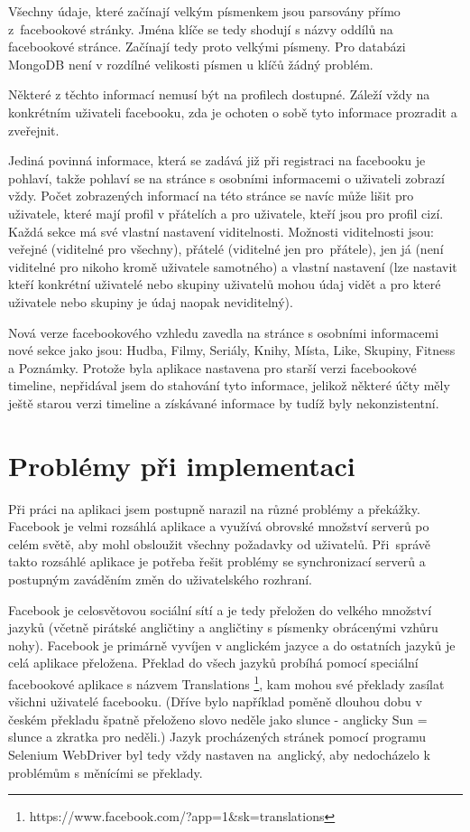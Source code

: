 \documentclass[thesis=M,czech]{FITthesis}[2013/05/10]
\begin{document}
Všechny údaje, které začínají velkým písmenkem jsou parsovány přímo z~facebookové stránky. Jména klíče se tedy shodují s názvy oddílů na facebookové stránce. Začínají tedy proto velkými písmeny. Pro databázi MongoDB není v rozdílné velikosti písmen u klíčů žádný problém.

Některé z těchto informací nemusí být na profilech dostupné. Záleží vždy na konkrétním uživateli facebooku, zda je ochoten o sobě tyto informace prozradit a zveřejnit.

Jediná povinná informace, která se zadává již při registraci na facebooku je pohlaví, takže pohlaví se na stránce s osobními informacemi o uživateli zobrazí vždy. Počet zobrazených informací na této stránce se navíc může lišit pro uživatele, které mají profil v přátelích a pro uživatele, kteří jsou pro profil cizí. Každá sekce má své vlastní nastavení viditelnosti. Možnosti viditelnosti jsou: veřejné (viditelné pro všechny), přátelé (viditelné jen pro~přátele), jen já (není viditelné pro nikoho kromě uživatele samotného) a vlastní nastavení (lze nastavit kteří konkrétní uživatelé nebo skupiny uživatelů mohou údaj vidět a pro které uživatele nebo skupiny je údaj naopak neviditelný).

Nová verze facebookového vzhledu zavedla na stránce s osobními informacemi nové sekce jako jsou: Hudba, Filmy, Seriály, Knihy, Místa, Like, Skupiny, Fitness a Poznámky. Protože byla aplikace nastavena pro starší verzi facebookové timeline, nepřidával jsem do stahování tyto informace, jelikož některé účty měly ještě starou verzi timeline a získávané informace by tudíž byly nekonzistentní.



\section{Problémy při implementaci}

Při práci na aplikaci jsem postupně narazil na různé problémy a překážky. Facebook je velmi rozsáhlá aplikace a využívá obrovské množství serverů po celém světě, aby mohl obsloužit všechny požadavky od uživatelů. Při~správě takto rozsáhlé aplikace je potřeba řešit problémy se synchronizací serverů a postupným zaváděním změn do uživatelského rozhraní.

Facebook je celosvětovou sociální sítí a je tedy přeložen do velkého množství jazyků (včetně pirátské angličtiny a angličtiny s písmenky obrácenými vzhůru nohy). Facebook je primárně vyvíjen v anglickém jazyce a do ostatních jazyků je celá aplikace přeložena. Překlad do všech jazyků probíhá pomocí speciální facebookové aplikace s názvem Translations \footnote{https://www.facebook.com/?app=1\&sk=translations}, kam mohou své překlady zasílat všichni uživatelé facebooku. (Dříve bylo například poměně dlouhou dobu v českém překladu špatně přeloženo slovo neděle jako slunce - anglicky Sun = slunce a zkratka pro neděli.) Jazyk procházených stránek pomocí programu Selenium WebDriver byl tedy vždy nastaven na~anglický, aby nedocházelo k problémům s měnícími se překlady. 
\end{document}
